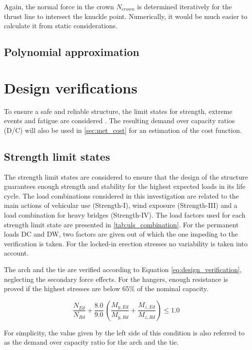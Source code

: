Again, the normal force in the crown $N_{crown}$ is determined iteratively for the thrust line to intersect the knuckle point. Numerically, it would be much easier to calculate it from static considerations.

\subsection{Polynomial approximation}

\newpage
\section{Design verifications} \label{sec:met_ver}
To ensure a safe and reliable structure, the limit states for strength, extreme events and fatigue are considered \cite{AASHTO}.  The resulting demand over capacity ratios (D/C) will also be used in \cref{sec:met_cost} for an estimation of the cost function.

\subsection{Strength limit states}
The strength limit states are considered to ensure that the design of the structure guarantees enough strength and stability for the highest expected loads in its life cycle. The load combinations considered in this investigation are related to the main actions of vehicular use (Strength-I), wind exposure (Strength-III) and a load combination for heavy bridges (Strength-IV). The load factors used for each strength limit state are presented in \cref{tab:uls_combination}. For the permanent loads DC and DW, two factors are given out of which the one impeding to the verification is taken. For the locked-in erection stresses no variability is taken into account.



The arch and the tie are verified according to Equation \eqref{eq:design_verification}, neglecting the secondary force effects. For the hangers, enough resistance is proved if the highest stresses are below 65\% of the nominal capacity. 

\begin{equation}
    \frac{N_{Ed}}{N_{Rd}} + \frac{8.0}{9.0}\, \left(\frac{M_{y,Ed}}{M_{y,Rd}}+\frac{M_{z,Ed}}{M_{z,Rd}} \right) \leq 1.0
    \label{eq:design_verification}
\end{equation}

For simplicity, the value given by the left side of this condition is also referred to as the demand over capacity ratio for the arch and the tie.

